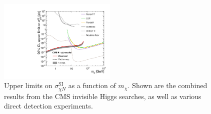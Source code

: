 \begin{figure}[]
    \begin{center}
        \includegraphics[width=0.5\textwidth]{figures/vbf/fits/dd.pdf}
        \caption{Upper limits on $\sigma^\mathrm{SI}_{\chi N}$ as a function of $m_\chi$. 
                 Shown are the combined results from the CMS invisible Higgs searches, as well as various direct detection experiments.}
        \label{fig:vbf:dd}
    \end{center}
\end{figure}

